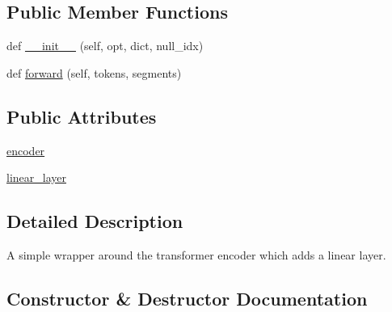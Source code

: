 \subsection*{Public Member Functions}
\begin{DoxyCompactItemize}
\item 
def \hyperlink{classparlai_1_1agents_1_1transformer_1_1crossencoder_1_1CrossEncoderModule_ad002e8a3432930432430e2b4c435cc3e}{\+\_\+\+\_\+init\+\_\+\+\_\+} (self, opt, dict, null\+\_\+idx)
\item 
def \hyperlink{classparlai_1_1agents_1_1transformer_1_1crossencoder_1_1CrossEncoderModule_a86a9cf18bddebb5a1ee9c4096cfe7c20}{forward} (self, tokens, segments)
\end{DoxyCompactItemize}
\subsection*{Public Attributes}
\begin{DoxyCompactItemize}
\item 
\hyperlink{classparlai_1_1agents_1_1transformer_1_1crossencoder_1_1CrossEncoderModule_a7b3493099f48331b36c465cc393b5145}{encoder}
\item 
\hyperlink{classparlai_1_1agents_1_1transformer_1_1crossencoder_1_1CrossEncoderModule_a50568203fcea07cca868109b95dc8dfc}{linear\+\_\+layer}
\end{DoxyCompactItemize}


\subsection{Detailed Description}
\begin{DoxyVerb}A simple wrapper around the transformer encoder which adds a linear layer.
\end{DoxyVerb}
 

\subsection{Constructor \& Destructor Documentation}
\mbox{\label{classparlai_1_1agents_1_1transformer_1_1crossencoder_1_1CrossEncoderModule_ad002e8a3432930432430e2b4c435cc3e}} 
